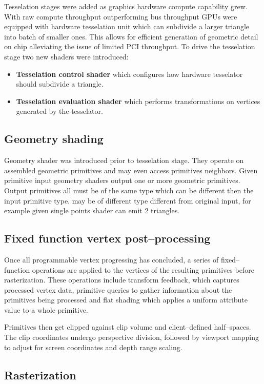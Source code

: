 Tesselation stages were added as graphics hardware compute capability grew. With raw compute throughput outperforming bus throughput GPUs were equipped with hardware
tesselation unit which can subdivide a larger triangle into batch of smaller ones. This allows for efficient generation of geometric detail on chip alleviating the 
issue of limited PCI throughput.
To drive the tesselation stage two new shaders were introduced:
\begin{itemize}
    \item \textbf{Tesselation control shader} which configures how hardware tesselator should subdivide a triangle.
    \item \textbf{Tesselation evaluation shader} which performs transformations on vertices generated by the tesselator.
\end{itemize}

\subsection{Geometry shading}

Geometry shader was introduced prior to tesselation stage. They operate on assembled geometric primitives and may even access primitives neighbors.
Given primitive input geometry shaders output one or more geometric primitives. Output primitives all must be of the same type which can be different then the input primitive type.
may be of different type different from original input, for example given single points shader can emit 2 triangles.

\subsection{Fixed function vertex post--processing}

Once all programmable vertex progressing has concluded, a series of fixed--function operations are applied to the vertices of the resulting primitives before rasterization.
These operations include transform feedback, which captures processed vertex data, 
primitive queries to gather information about the primitives being processed 
and flat shading which applies a uniform attribute value to a whole primitive.

Primitives then get clipped against clip volume and client--defined half--spaces.
The clip coordinates undergo perspective division, followed by viewport mapping to adjust for screen coordinates and depth range scaling.

\subsection{Rasterization}

